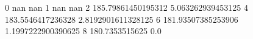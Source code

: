 0 nan nan
1 nan nan
2 185.79861450195312 5.063262939453125
4 183.5546417236328 2.8192901611328125
6 181.93507385253906 1.1997222900390625
8 180.7353515625 0.0
